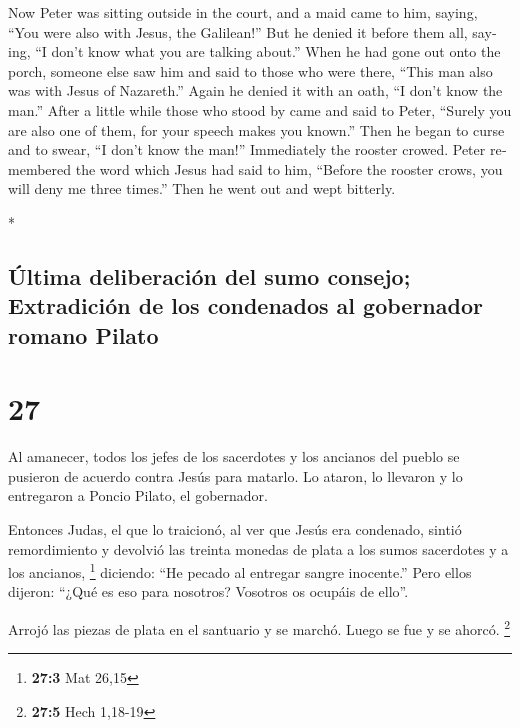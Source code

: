 \begin{paracol}{2}
\begin{otherlanguage}{english}
 Now Peter was sitting outside in the court, and a maid
came to him, saying, ``You were also with Jesus, the Galilean!''
 But he denied it before them all, saying, ``I don't know
what you are talking about.''  When he had gone out onto
the porch, someone else saw him and said to those who were there, ``This
man also was with Jesus of Nazareth.''  Again he denied
it with an oath, ``I don't know the man.''  After a
little while those who stood by came and said to Peter, ``Surely you are
also one of them, for your speech makes you known.'' 
Then he began to curse and to swear, ``I don't know the man!''
Immediately the rooster crowed.  Peter remembered the
word which Jesus had said to him, ``Before the rooster crows, you will
deny me three times.'' Then he went out and wept bitterly.

\end{otherlanguage}

\switchcolumn[0]*

\hypertarget{uxfaltima-deliberaciuxf3n-del-sumo-consejo-extradiciuxf3n-de-los-condenados-al-gobernador-romano-pilato}{%
\subsection{Última deliberación del sumo consejo; Extradición de los
condenados al gobernador romano
Pilato}\label{uxfaltima-deliberaciuxf3n-del-sumo-consejo-extradiciuxf3n-de-los-condenados-al-gobernador-romano-pilato}}

\hypertarget{section-52}{%
\section{27}\label{section-52}}

 Al amanecer, todos los jefes de los sacerdotes y los
ancianos del pueblo se pusieron de acuerdo contra Jesús para matarlo.
 Lo ataron, lo llevaron y lo entregaron a Poncio Pilato,
el gobernador.

 Entonces Judas, el que lo traicionó, al ver que Jesús era
condenado, sintió remordimiento y devolvió las treinta monedas de plata
a los sumos sacerdotes y a los ancianos, \footnote{\textbf{27:3} Mat
  26,15}  diciendo: ``He pecado al entregar sangre
inocente.'' Pero ellos dijeron: ``¿Qué es eso para nosotros? Vosotros os
ocupáis de ello''.

 Arrojó las piezas de plata en el santuario y se marchó.
Luego se fue y se ahorcó. \footnote{\textbf{27:5} Hech 1,18-19}


\end{paracol}
